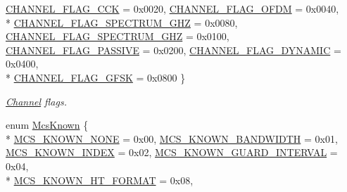 \begin{DoxyCompactItemize}
\hyperlink{classns3_1_1RadiotapHeader_a26df5fbb86499c692bd97a99781c8140a740fb537c6a0c4c743e3d597d99b7714}{C\+H\+A\+N\+N\+E\+L\+\_\+\+F\+L\+A\+G\+\_\+\+C\+CK} = 0x0020, 
\hyperlink{classns3_1_1RadiotapHeader_a26df5fbb86499c692bd97a99781c8140a618a5705ee75fd8eea124cd36a6bfbba}{C\+H\+A\+N\+N\+E\+L\+\_\+\+F\+L\+A\+G\+\_\+\+O\+F\+DM} = 0x0040, 
\\*
\hyperlink{classns3_1_1RadiotapHeader_a26df5fbb86499c692bd97a99781c8140ad68676f7619fa54f09340cd1f4f72ce6}{C\+H\+A\+N\+N\+E\+L\+\_\+\+F\+L\+A\+G\+\_\+\+S\+P\+E\+C\+T\+R\+U\+M\+\_\+G\+HZ} = 0x0080, 
\hyperlink{classns3_1_1RadiotapHeader_a26df5fbb86499c692bd97a99781c8140acfb568bbac292324781feea8775ea1a1}{C\+H\+A\+N\+N\+E\+L\+\_\+\+F\+L\+A\+G\+\_\+\+S\+P\+E\+C\+T\+R\+U\+M\+\_\+G\+HZ} = 0x0100, 
\hyperlink{classns3_1_1RadiotapHeader_a26df5fbb86499c692bd97a99781c8140a4b06c977d2548e163f4f27add2d31b25}{C\+H\+A\+N\+N\+E\+L\+\_\+\+F\+L\+A\+G\+\_\+\+P\+A\+S\+S\+I\+VE} = 0x0200, 
\hyperlink{classns3_1_1RadiotapHeader_a26df5fbb86499c692bd97a99781c8140a496c1a13fad700978d3855eb01fcd2d7}{C\+H\+A\+N\+N\+E\+L\+\_\+\+F\+L\+A\+G\+\_\+\+D\+Y\+N\+A\+M\+IC} = 0x0400, 
\\*
\hyperlink{classns3_1_1RadiotapHeader_a26df5fbb86499c692bd97a99781c8140a165f590a06eb1a5ba2e9ca2c53971bf3}{C\+H\+A\+N\+N\+E\+L\+\_\+\+F\+L\+A\+G\+\_\+\+G\+F\+SK} = 0x0800
 \}\begin{DoxyCompactList}\small\item\em \hyperlink{classns3_1_1Channel}{Channel} flags. \end{DoxyCompactList}
\item 
enum \hyperlink{classns3_1_1RadiotapHeader_aac7ef91c429fa95640a0e3a996b6741d}{Mcs\+Known} \{ \\*
\hyperlink{classns3_1_1RadiotapHeader_aac7ef91c429fa95640a0e3a996b6741da5f2972d03b27b90f0dbdc5a903e2decc}{M\+C\+S\+\_\+\+K\+N\+O\+W\+N\+\_\+\+N\+O\+NE} = 0x00, 
\hyperlink{classns3_1_1RadiotapHeader_aac7ef91c429fa95640a0e3a996b6741da7bbfbd0cfea7cfe806ec9dee40c8565b}{M\+C\+S\+\_\+\+K\+N\+O\+W\+N\+\_\+\+B\+A\+N\+D\+W\+I\+D\+TH} = 0x01, 
\hyperlink{classns3_1_1RadiotapHeader_aac7ef91c429fa95640a0e3a996b6741daab8509a5cfee677782d45ad3bca2cac2}{M\+C\+S\+\_\+\+K\+N\+O\+W\+N\+\_\+\+I\+N\+D\+EX} = 0x02, 
\hyperlink{classns3_1_1RadiotapHeader_aac7ef91c429fa95640a0e3a996b6741da5dbf7e5fad03d398c6e4e0c349052c6c}{M\+C\+S\+\_\+\+K\+N\+O\+W\+N\+\_\+\+G\+U\+A\+R\+D\+\_\+\+I\+N\+T\+E\+R\+V\+AL} = 0x04, 
\\*
\hyperlink{classns3_1_1RadiotapHeader_aac7ef91c429fa95640a0e3a996b6741da8b123c61d88b5d740e29ed68fb61d167}{M\+C\+S\+\_\+\+K\+N\+O\+W\+N\+\_\+\+H\+T\+\_\+\+F\+O\+R\+M\+AT} = 0x08, 

\end{DoxyCompactItemize}
